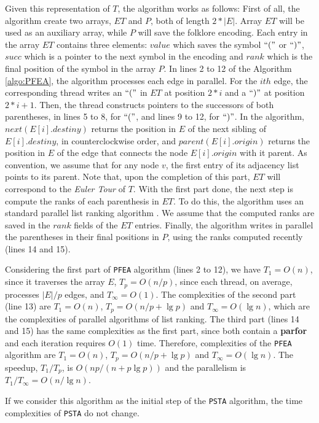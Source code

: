 Given this representation of $T$, the algorithm works as follows: 
First of all, the algorithm create two arrays, $ET$ and $P$, both of length $2*|E|$. Array $ET$ will be used as an auxiliary array, while $P$ will save the folklore encoding. Each entry in the array $ET$ contains three elements: $value$ which saves the symbol $``("$ or $``)"$, $succ$ which is a pointer to the next symbol in the encoding and $rank$ which is the final position of the symbol in the array $P$. In lines 2 to 12 of the Algorithm \ref{algo:PFEA}, the algorithm processes each edge in parallel. For the $ith$ edge, the corresponding thread writes an $``("$ in $ET$ at position $2*i$ and a $``)"$ at position $2*i+1$. Then, the thread constructs pointers to the successors of both parentheses, in lines 5 to 8, for $``("$, and lines 9 to 12, for $``)"$. In the algorithm, $next(E[i].destiny)$ returns the position in $E$ of the next sibling of $E[i].destiny$, in counterclockwise order, and $parent(E[i].origin)$ returns the position in $E$ of the edge that connects the node $E[i].origin$ with it parent. As convention, we assume that for any node $v$, the first entry of its adjacency list points to its parent. Note that, upon the completion of this part, $ET$ will correspond to the \emph{Euler Tour} of $T$.
With the first part done, the next step is compute the ranks of each parenthesis in $ET$. To do this, the algorithm uses an standard parallel list ranking algorithm \cite{Helman2001265}. We assume that the computed ranks are saved in the $rank$ fields of the $ET$ entries. Finally, the algorithm writes in parallel the parentheses in their final positions in $P$, using the ranks computed recently (lines 14 and 15).

Considering the first part of {\tt PFEA} algorithm (lines 2 to 12), we have $T_1 = O(n)$, since it traverses the array $E$, $T_p = O(n/p)$, since each thread, on average, processes $|E|/p$ edges, and $T_{\infty} = O(1)$. The complexities of the second part (line 13) are $T_1=O(n)$, $T_p=O(n/p+\lg p)$ and $T_{\infty}=O(\lg n)$, which are the complexities of parallel algorithms of list ranking. The third part (lines 14 and 15) has the same complexities as the first part, since both contain a {\bf parfor} and each iteration requires $O(1)$ time. Therefore, complexities of the {\tt PFEA} algorithm are
$T_1=O(n)$, $T_p=O(n/p+\lg p)$ and $T_{\infty}=O(\lg n)$. The speedup, $T_1/T_p$, is $O(np/(n+p\lg p))$ and the parallelism is $T_1/T_{\infty} = O(n/\lg n)$.

If we consider this algorithm as the initial step of the {\tt PSTA} algorithm, the time complexities of {\tt PSTA} do not change.